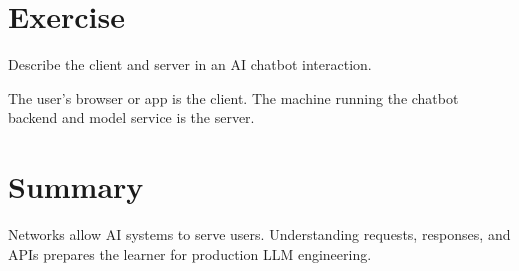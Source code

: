\section{Exercise}
\begin{exercise}Describe the client and server in an AI chatbot interaction.\end{exercise}
\begin{solution}The user's browser or app is the client. The machine running the chatbot backend and model service is the server.\end{solution}

\section{Summary}
Networks allow AI systems to serve users. Understanding requests, responses, and APIs prepares the learner for production LLM engineering.
